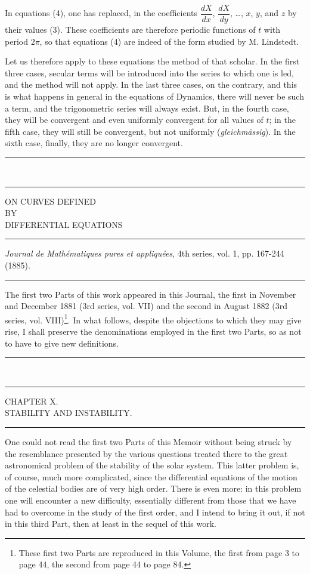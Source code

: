\documentclass[11pt]{article}
\newcommand{\ornament}{\begin{center}\rule{2.5em}{0.4pt}\,\raisebox{0.1ex}{\tiny$\bullet\bullet\bullet$}\,\rule{2.5em}{0.4pt}\end{center}}
\newcommand{\shortline}{\begin{center}\rule{3.5em}{0.4pt}\end{center}}
\begin{document}
In equations (4), one has replaced, in the coefficients $\dfrac{dX}{dx}$, $\dfrac{dX}{dy}$, \ldots, $x$, $y$, and $z$ by their values (3). These coefficients are therefore periodic functions of $t$ with period $2\pi$, so that equations (4) are indeed of the form studied by M. Lindstedt.

Let us therefore apply to these equations the method of that scholar. In the first three cases, secular terms will be introduced into the series to which one is led, and the method will not apply. In the last three cases, on the contrary, and this is what happens in general in the equations of Dynamics, there will never be such a term, and the trigonometric series will always exist. But, in the fourth case, they will be convergent and even uniformly convergent for all values of $t$; in the fifth case, they will still be convergent, but not uniformly (\emph{gleichmässig}). In the sixth case, finally, they are no longer convergent.

\ornament
\clearpage

\begin{center}
{\Large ON CURVES DEFINED}\\[0.8em]
{\small BY}\\[0.8em]
{\large DIFFERENTIAL EQUATIONS}
\end{center}
\shortline
\begin{center}
\emph{Journal de Mathématiques pures et appliquées}, 4th series, vol. 1, pp. 167-244 (1885).
\end{center}
\shortline

The first two Parts of this work appeared in this Journal, the first in November and December 1881 (3rd series, vol. VII) and the second in August 1882 (3rd series, vol. VIII)\footnote{These first two Parts are reproduced in this Volume, the first from page 3 to page 44, the second from page 44 to page 84.}. In what follows, despite the objections to which they may give rise, I shall preserve the denominations employed in the first two Parts, so as not to have to give new definitions.

\ornament

\begin{center}
{\Large CHAPTER X.}\\[0.4em]
{\small STABILITY AND INSTABILITY.}
\end{center}
\shortline

One could not read the first two Parts of this Memoir without being struck by the resemblance presented by the various questions treated there to the great astronomical problem of the stability of the solar system. This latter problem is, of course, much more complicated, since the differential equations of the motion of the celestial bodies are of very high order. There is even more: in this problem one will encounter a new difficulty, essentially different from those that we have had to overcome in the study of the first order, and I intend to bring it out, if not in this third Part, then at least in the sequel of this work.
\end{document}
